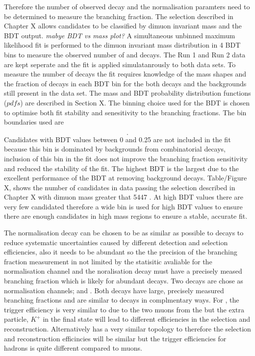 Therefore the number of observed \bmumu decay and the normalisation paramters need to be determined to measure the branching fraction. The selection described in Chapter X allows \bmumu candidates to be classified by dimuon invariant mass and the BDT output. {\it mabye BDT vs mass plot?} A simultaneous unbinned maximum likelihood fit is performed to the dimuon invariant mass distribution in 4 BDT bins to measure the observed number of \bdmumu and \bsmumu decays. The Run 1 and Run 2 data are kept seperate and the fit is applied simulatanrously to both data sets. To measure the number of \bmumu decays the fit requires knowledge of the mass shapes and the fraction of decays in each BDT bin for the both \bmumu decays and the backgrounds still present in the data set. The mass and BDT probability distribution functions ($pdfs$) are described in Section X.
The binning choice used for the BDT is chosen to optimise both fit stability and senesitivity to the \bmumu branching fractions. The bin boundaries used are


\begin{equation}
[0.25, 0.4, 0.5, 0.6, 1.0].
\label{eq:BDTbins}
\end{equation}
Candidates with BDT values between 0 and 0.25 are not included in the fit because this bin is dominated by backgrounds from combinatorial decays, inclusion of this bin in the fit does not improve the branching fraction sensitivity and reduced the stability of the fit. The highest BDT is the largest due to the excellent performance of the BDT at removing background decays. Table/Figure X, shows the number of \bmumu candidates in data passing the selection described in Chapter X with dimuon mass greater that 5447 \mevcc. At high BDT values there are very few candidated therefore a wide bin is used for high BDT values to ensure there are enough candidates in high mass regions to ensure a stable, accurate fit.

The normalisation decay can be chosen to be as similar as possible to \bmumu decays to reduce systematic uncertainties caused by different detection and selection efficiencies, also it needs to be abundant so the the precision of the branching fraction measurement in not limited by the statisitic avaliable for the normalisation channel and the noralisation decay must have a precisely meased branching fraction which is likely for abundant decays. Two decays are chose as normalisation channels; \bujpsik and \bdkpi. Both decays have large, precisely measured branching fractions and are similar to \bmumu decays in complmentary ways. For \bujpsik, the trigger efficiency is very similar to \bmumu due to the two muons from the \jpsi but the extra particle, $K^{+}$ in the final state will lead to different efficiencies in the selection and reconstruction. Alternatively \bdkpi has a very similar topology to \bmumu therefore the selection and reconstruction efficincies will be similar but the trigger efficiencies for hadrons is quite different compared to muons.  

